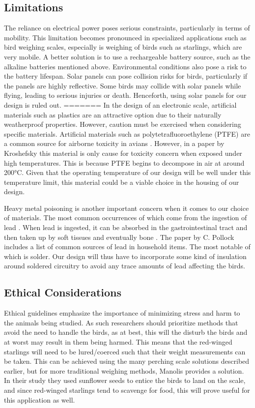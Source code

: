 \documentclass[class=report,11pt,crop=false]{standalone}
\begin{document}
\subsection{Limitations}
The reliance on electrical power poses serious constraints, particularly in terms of mobility. This limitation becomes pronounced in specialized applications such as bird weighing scales, especially is weighing of birds such as starlings, which are very mobile. A better solution is to use a rechargeable battery source, such as the alkaline batteries mentioned above. Environmental conditions also pose a risk to the battery lifespan. Solar panels can pose collision risks for birds, particularly if the panels are highly reflective. Some birds may collide with solar panels while flying, leading to serious injuries or death. Henceforth, using solar panels for our design is ruled out. 
=======
In the design of an electronic scale, artificial materials such as plastics are an attractive option due to their naturally weatherproof properties. However, caution must be exercised when considering specific materials. Artificial materials such as polytetrafluoroethylene (PTFE) are a common source for airborne toxicity in avians \cite{LightfootToxicity}. However, in a paper by Kroshefsky \cite{KroshefskyTeflon} this material is only cause for toxicity concern when exposed under high temperatures. This is because PTFE begins to decompose in air at around 200°C. Given that the operating temperature of our design will be well under this temperature limit, this material could be a viable choice in the housing of our design.

Heavy metal poisoning is another important concern when it comes to our choice of materials. The most common occurrences of which come from the ingestion of lead \cite{PollockHeavyMetal}. When lead is ingested, it can be absorbed in the gastrointestinal tract and then taken up by soft tissues and eventually bone \cite{PollockHeavyMetal}. The paper by C. Pollock includes a list of common sources of lead in household items. The most notable of which is solder. Our design will thus have to incorporate some kind of insulation around soldered circuitry to avoid any trace amounts of lead affecting the birds.

\subsection{Ethical Considerations}
Ethical guidelines emphasize the importance of minimizing stress and harm to the animals being studied. As such researchers should prioritize methods that avoid the need to handle the birds, as at best, this will the disturb the birds and at worst may result in them being harmed. This means that the red-winged starlings will need to be lured/coerced such that their weight measurements can be taken. This can be achieved using the many perching scale solutions described earlier, but for more traditional weighing methods, Manolis \cite{reid1999measurement} provides a solution. In their study they used sunflower seeds to entice the birds to land on the scale, and since red-winged starlings tend to scavenge for food, this will prove useful for this application as well. 
\end{document}
